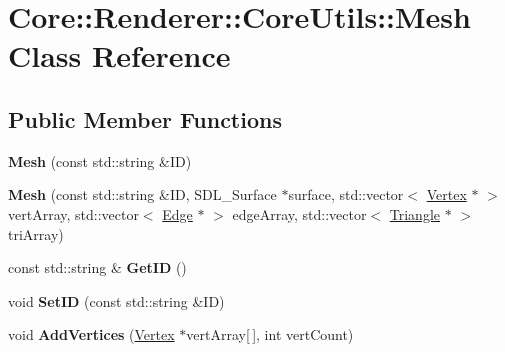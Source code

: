 \hypertarget{class_core_1_1_renderer_1_1_core_utils_1_1_mesh}{\section{Core\+:\+:Renderer\+:\+:Core\+Utils\+:\+:Mesh Class Reference}
\label{class_core_1_1_renderer_1_1_core_utils_1_1_mesh}
}
\subsection*{Public Member Functions}
\begin{DoxyCompactItemize}
\item 
\hypertarget{class_core_1_1_renderer_1_1_core_utils_1_1_mesh_a5f74676540f5a27ef5d263a38956da63}{{\bfseries Mesh} (const std\+::string \&I\+D)}\label{class_core_1_1_renderer_1_1_core_utils_1_1_mesh_a5f74676540f5a27ef5d263a38956da63}

\item 
\hypertarget{class_core_1_1_renderer_1_1_core_utils_1_1_mesh_a6e0b0aeaea8d0671592a960d3b2c3d52}{{\bfseries Mesh} (const std\+::string \&I\+D, S\+D\+L\+\_\+\+Surface $\ast$surface, std\+::vector$<$ \hyperlink{class_core_1_1_renderer_1_1_core_utils_1_1_vertex}{Vertex} $\ast$ $>$ vert\+Array, std\+::vector$<$ \hyperlink{class_core_1_1_renderer_1_1_core_utils_1_1_edge}{Edge} $\ast$ $>$ edge\+Array, std\+::vector$<$ \hyperlink{class_core_1_1_renderer_1_1_core_utils_1_1_triangle}{Triangle} $\ast$ $>$ tri\+Array)}\label{class_core_1_1_renderer_1_1_core_utils_1_1_mesh_a6e0b0aeaea8d0671592a960d3b2c3d52}

\item 
\hypertarget{class_core_1_1_renderer_1_1_core_utils_1_1_mesh_a31830d2038013a312e8e44ce8de5276d}{const std\+::string \& {\bfseries Get\+I\+D} ()}\label{class_core_1_1_renderer_1_1_core_utils_1_1_mesh_a31830d2038013a312e8e44ce8de5276d}

\item 
\hypertarget{class_core_1_1_renderer_1_1_core_utils_1_1_mesh_a0bfc5d6084358bcce87d8e7586afb409}{void {\bfseries Set\+I\+D} (const std\+::string \&I\+D)}\label{class_core_1_1_renderer_1_1_core_utils_1_1_mesh_a0bfc5d6084358bcce87d8e7586afb409}

\item 
\hypertarget{class_core_1_1_renderer_1_1_core_utils_1_1_mesh_a5aaffbd4be52c7b702ea5db0fbfe0fbd}{void {\bfseries Add\+Vertices} (\hyperlink{class_core_1_1_renderer_1_1_core_utils_1_1_vertex}{Vertex} $\ast$vert\+Array\mbox{[}$\,$\mbox{]}, int vert\+Count)}\label{class_core_1_1_renderer_1_1_core_utils_1_1_mesh_a5aaffbd4be52c7b702ea5db0fbfe0fbd}


\end{DoxyCompactItemize}
